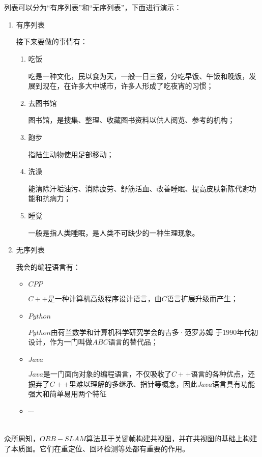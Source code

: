 \documentclass[12pt, twocolumn]{article}
\newcommand{\normf}{\kaishu}
\begin{document}
	\section{\normf{列表的使用}}
	\normf
	列表可以分为“有序列表”和“无序列表”，下面进行演示：
	\begin{enumerate}
		\item 有序列表
		
		接下来要做的事情有：
		\begin{enumerate}
			\item 吃饭
			
			吃是一种文化，民以食为天，一般一日三餐，分吃早饭、午饭和晚饭，发展到现在，在许多大中城市，许多人形成了吃夜宵的习惯；
			\item 去图书馆
			
			图书馆，是搜集、整理、收藏图书资料以供人阅览、参考的机构；
			\item 跑步
			
			指陆生动物使用足部移动；
			\item 洗澡
			
			能清除汗垢油污、消除疲劳、舒筋活血、改善睡眠、提高皮肤新陈代谢功能和抗病力；
			\item 睡觉
			
			一般是指人类睡眠，是人类不可缺少的一种生理现象。
		\end{enumerate}
		\item 无序列表
		
		我会的编程语言有：
		\begin{itemize}
			\item $CPP$
			
			$C++$是一种计算机高级程序设计语言，由$C$语言扩展升级而产生；
			\item $Python$
			
			$Python$由荷兰数学和计算机科学研究学会的吉多·范罗苏姆 于$1990$年代初设计，作为一门叫做$ABC$语言的替代品；
			\item $Java$
			
			$Java$是一门面向对象的编程语言，不仅吸收了$C++$语言的各种优点，还摒弃了$C++$里难以理解的多继承、指针等概念，因此$Java$语言具有功能强大和简单易用两个特征
			
			\item $\cdots$
		\end{itemize}
	\end{enumerate}
	
	\section{\normf{论文的引用}}
	\normf
	众所周知，$ORB-SLAM$\cite{ref:orb}算法基于关键帧构建共视图，并在共视图的基础上构建了本质图。它们在重定位、回环检测等处都有重要的作用。
	
\end{document}
